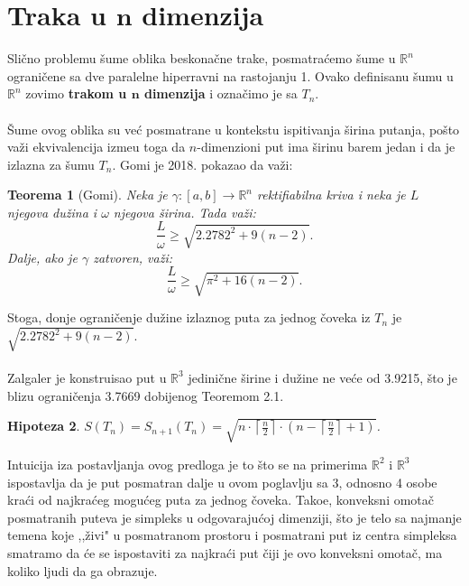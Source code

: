 \documentclass[11pt]{article}
\newtheorem{teo}{\bf Teorema}[section]
\newtheorem{pred}[teo]{\bf Hipoteza}
\begin{document}
\section[Traka u $\textbf{n}$ dimenzija]{Traka u $\textbf{n}$ dimenzija}
\bigskip
 Sli\v cno problemu \v sume oblika beskona\v cne trake, posmatra\' cemo \v sume u $\mathbb{R}^n$ ograni\v cene sa dve paralelne hiperravni na rastojanju 1. Ovako definisanu \v sumu u $\mathbb{R}^n$ zovimo \textbf{trakom u $\textbf{n}$ dimenzija} i ozna\v cimo je sa $T_n$.
\\
\\
\indent \v Sume ovog oblika su ve\' c posmatrane u kontekstu ispitivanja \v sirina putanja, po\v sto va\v zi ekvivalencija izme\dj u toga da $n$-dimenzioni put ima \v sirinu barem jedan i da je izlazna za \v sumu $T_n$. Gomi \cite{Ghomi} je 2018. pokazao da va\v zi:
\smallskip
\begin{teo}[Gomi] 
Neka je $\gamma: [a,b]\to \mathbb{R}^n$ rektifiabilna kriva i neka je $L$ njegova du\v zina i $\omega$ njegova \v sirina. Tada va\v zi:
$$\frac{L}{\omega}\geqslant \sqrt{2.2782^2+9(n-2)}.$$
Dalje, ako je $\gamma$ zatvoren, va\v zi:
$$\frac{L}{\omega}\geqslant \sqrt{\pi^2+16(n-2)}.$$
\end{teo}
\bigskip

\indent Stoga, donje ograni\v cenje du\v zine izlaznog puta za jednog \v coveka iz $T_n$ je $ \sqrt{2.2782^2+9(n-2)}$.
\\
\\
Zalgaler \cite{Zalgaller3d} je konstruisao put u $\mathbb{R}^3$ jedini\v cne \v sirine i du\v zine ne ve\' ce od 3.9215, \v sto je blizu ograni\v cenja 3.7669 dobijenog Teoremom 2.1.
\\
\begin{pred} $S(T_n)=S_{n+1}(T_n)=\sqrt{n\cdot\left\lceil\frac{n}{2}\right\rceil\cdot\left( n-\left\lceil\frac{n}{2}\right\rceil+1\right)}$.\end{pred}
\smallskip

\indent Intuicija iza postavljanja ovog predloga je to \v sto se na primerima $\mathbb{R}^2$ i $\mathbb{R}^3$ ispostavlja da je put posmatran dalje u ovom poglavlju sa 3, odnosno 4 osobe kra\' ci od najkra\' ceg mogu\' ceg puta za jednog \v coveka. Tako\dj e, konveksni omota\v c posmatranih puteva je simpleks u odgovaraju\' coj dimenziji, \v sto je telo sa najmanje temena koje ,,\v zivi" u posmatranom prostoru i posmatrani put iz centra simpleksa smatramo da \' ce se ispostaviti za najkra\' ci put \v ciji je ovo konveksni omota\v c, ma koliko ljudi da ga obrazuje.
\end{document}
